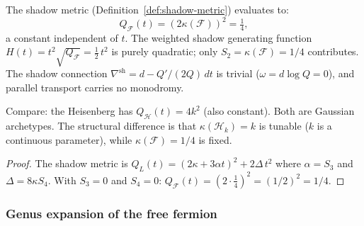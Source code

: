 \begin{proposition}
\label{prop:fermion-shadow-metric}
The shadow metric \textup{(}Definition~\textup{\ref{def:shadow-metric}}\textup{)}
evaluates to:
\begin{equation}\label{eq:fermion-shadow-metric}
Q_{\mathcal{F}}(t) = (2\kappa(\mathcal F))^2 = \tfrac{1}{4},
\end{equation}
a constant independent of $t$. The weighted shadow generating function
$H(t) = t^2 \sqrt{Q_{\mathcal{F}}} = \tfrac{1}{2}\,t^2$ is purely
quadratic; only $S_2 = \kappa(\mathcal F)=1/4$ contributes. The shadow
connection $\nabla^{\mathrm{sh}} = d - Q'/(2Q)\,dt$ is trivial
\textup{(}$\omega = d\log Q = 0$\textup{)}, and parallel transport
carries no monodromy.

Compare: the Heisenberg has
$Q_{\mathcal{H}}(t) = 4k^2$ \textup{(}also constant\textup{)}. Both
are Gaussian archetypes. The structural difference is that
$\kappa(\mathcal{H}_k) = k$ is tunable
\textup{(}$k$ is a continuous parameter\textup{)}, while
$\kappa(\mathcal{F}) = 1/4$ is fixed.
\end{proposition}

\begin{proof}
The shadow metric is $Q_L(t) = (2\kappa + 3\alpha t)^2 + 2\Delta\,t^2$
where $\alpha = S_3$ and $\Delta = 8\kappa S_4$. With
$S_3 = 0$ and $S_4 = 0$:
$Q_{\mathcal{F}}(t) = (2 \cdot \tfrac{1}{4})^2 = (1/2)^2 = 1/4$.
\end{proof}

\subsubsection{Genus expansion of the free fermion}
\label{sec:fermion-genus-expansion}%
%

